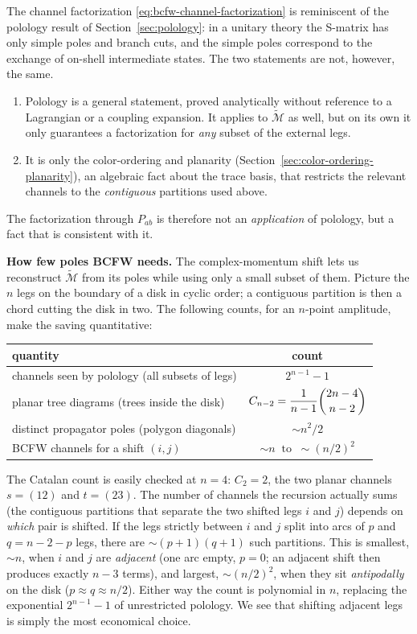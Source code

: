 \begin{remark}
	The channel factorization \eqref{eq:bcfw-channel-factorization} is reminiscent of the polology result of Section~\ref{sec:polology}: in a unitary theory the S-matrix has only simple poles and branch cuts, and the simple poles correspond to the exchange of on-shell intermediate states. The two statements are not, however, the same.
	\begin{enumerate}
		\item Polology is a general statement, proved analytically without reference to a Lagrangian or a coupling expansion. It applies to $\widetilde{\mathcal{M}}$ as well, but on its own it only guarantees a factorization for \emph{any} subset of the external legs.
		\item It is only the color-ordering and planarity (Section~\ref{sec:color-ordering-planarity}), an algebraic fact about the trace basis, that restricts the relevant channels to the \emph{contiguous} partitions used above.
	\end{enumerate}
	The factorization through $P_{ab}$ is therefore not an \emph{application} of polology, but a fact that is consistent with it.
\end{remark}

\textbf{How few poles BCFW needs.} The complex-momentum shift lets us reconstruct $\widetilde{\mathcal{M}}$ from its poles while using only a small subset of them. Picture the $n$ legs on the boundary of a disk in cyclic order; a contiguous partition is then a chord cutting the disk in two. The following counts, for an $n$-point amplitude, make the saving quantitative:
\begin{center}
	\small
	\begin{tabular}{lc}
		\hline
		quantity & count \\
		\hline
		channels seen by polology (all subsets of legs) & $2^{n-1} - 1$ \\[0.4ex]
		planar tree diagrams (trees inside the disk) & $C_{n-2} = \dfrac{1}{n-1}\dbinom{2n-4}{n-2}$ \\[1.2ex]
		distinct propagator poles (polygon diagonals) & $\sim n^2/2$ \\[0.4ex]
		BCFW channels for a shift $(i,j)$ & $\sim n \ \text{ to }\ \sim (n/2)^2$ \\
		\hline
	\end{tabular}
\end{center}
The Catalan count is easily checked at $n = 4$: $C_2 = 2$, the two planar channels $s = (12)$ and $t = (23)$. The number of channels the recursion actually sums (the contiguous partitions that separate the two shifted legs $i$ and $j$) depends on \emph{which} pair is shifted. If the legs strictly between $i$ and $j$ split into arcs of $p$ and $q = n - 2 - p$ legs, there are $\sim (p+1)(q+1)$ such partitions. This is smallest, $\sim n$, when $i$ and $j$ are \emph{adjacent} (one arc empty, $p = 0$; an adjacent shift then produces exactly $n - 3$ terms), and largest, $\sim (n/2)^2$, when they sit \emph{antipodally} on the disk ($p \approx q \approx n/2$). Either way the count is polynomial in $n$, replacing the exponential $2^{n-1} - 1$ of unrestricted polology. We see that shifting adjacent legs is simply the most economical choice.

